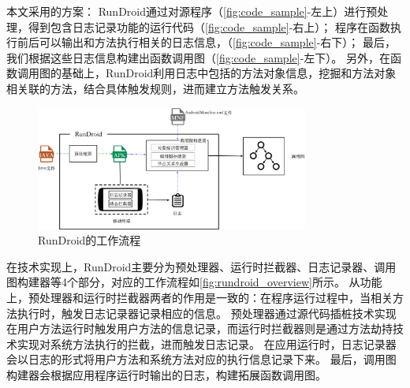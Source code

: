 本文采用的方案：
RunDroid通过对源程序（\autoref{fig:code_sample}-左上）进行预处理，得到包含日志记录功能的运行代码（\autoref{fig:code_sample}-右上）；
程序在函数执行前后可以输出和方法执行相关的日志信息，（\autoref{fig:code_sample}-右下）；
最后，我们根据这些日志信息构建出函数调用图（\autoref{fig:code_sample}-左下）。
另外，在函数调用图的基础上，RunDroid利用日志中包括的方法对象信息，挖掘和方法对象相关联的方法，结合具体触发规则，进而建立方法触发关系。



\begin{figure}[!ht]
	\centering
	\includegraphics[width=0.8\textwidth]{./Figures/rundroid-overview.png}
	\caption{ RunDroid的工作流程}
	\label{fig:rundroid_overview}
\end{figure}

在技术实现上，RunDroid主要分为预处理器、运行时拦截器、日志记录器、调用图构建器等4个部分，对应的工作流程如\autoref{fig:rundroid_overview}所示。
从功能上，预处理器和运行时拦截器两者的作用是一致的：在程序运行过程中，当相关方法执行时，触发日志记录器记录相应的信息。
预处理器通过源代码插桩技术实现在用户方法运行时触发用户方法的信息记录，而运行时拦截器则是通过方法劫持技术实现对系统方法执行的拦截，进而触发日志记录。
在应用运行时，日志记录器会以日志的形式将用户方法和系统方法对应的执行信息记录下来。
最后，调用图构建器会根据应用程序运行时输出的日志，构建拓展函数调用图。






